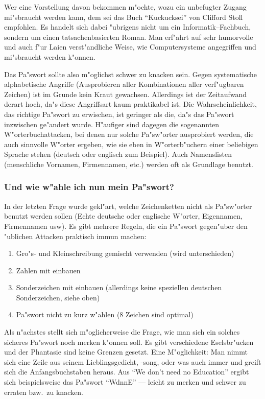 \documentclass[12pt,titlepage,twoside]{scrartcl}
\begin{document}
Wer eine Vorstellung davon bekommen m"ochte, wozu ein unbefugter Zugang
mi"sbraucht werden kann, dem sei das Buch "`Kuckucksei"' von Clifford Stoll
empfohlen. Es handelt sich dabei "ubrigens nicht um ein Informatik--Fachbuch,
sondern um einen tatsachenbasierten Roman. Man erf"ahrt auf sehr humorvolle und
auch f"ur Laien verst"andliche Weise, wie Computersysteme angegriffen und
mi"sbraucht werden k"onnen. 

Das Pa"swort sollte also m"oglichst schwer zu knacken sein. Gegen systematische
alphabetische Angriffe (Ausprobieren aller Kombinationen aller verf"ugbaren
Zeichen) ist im Grunde kein Kraut gewachsen. Allerdings ist der Zeitaufwand
derart hoch, da"s diese Angriffsart kaum praktikabel ist. Die
Wahrscheinlichkeit, das richtige Pa"swort zu erwischen, ist geringer als die,
da"s das Pa"swort inzwischen ge"andert wurde. H"aufiger sind dagegen die
sogenannten W"orterbuchattacken, bei denen nur solche Pa"sw"orter ausprobiert
werden, die auch sinnvolle W"orter ergeben, wie sie eben in W"orterb"uchern einer
beliebigen Sprache stehen (deutsch oder englisch zum Beispiel). Auch
Namenslisten (menschliche Vornamen, Firmennamen, etc.) werden oft als
Grundlage benutzt.

\subsubsection*{Und wie w"ahle ich nun mein Pa"swort?}

In der letzten Frage wurde gekl"art, welche Zeichenketten nicht als Pa"sw"orter
benutzt werden sollen (Echte deutsche oder englische W"orter, Eigennamen,
Firmennamen usw). Es gibt mehrere Regeln, die ein Pa"swort gegen"uber den
"ublichen Attacken praktisch immun machen: 

\begin{enumerate}
  \item Gro"s- und Kleinschreibung gemischt verwenden (wird unterschieden)
  \item Zahlen mit einbauen
  \item Sonderzeichen mit einbauen (allerdings keine speziellen deutschen
    Sonderzeichen, siehe oben)
  \item Pa"swort nicht zu kurz w"ahlen (8 Zeichen sind optimal) 
\end{enumerate}

Als n"achstes stellt sich m"oglicherweise die Frage, wie man sich ein solches
sicheres Pa"swort noch merken k"onnen soll. Es gibt verschiedene Eselsbr"ucken
und der Phantasie sind keine Grenzen gesetzt. Eine M"oglichkeit: Man nimmt sich
eine Zeile aus seinem Lieblingsgedicht, -song, oder was auch immer und greift
sich die Anfangsbuchstaben heraus. Aus "`We don't need no Education"' ergibt
sich beispielsweise das Pa"swort "`WdnnE"' --- leicht zu merken und schwer zu
erraten bzw.\  zu knacken.
\end{document}
